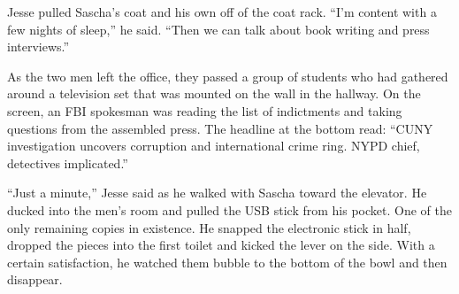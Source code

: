\documentclass[12pt]{book}
\begin{document}
Jesse pulled Sascha's coat and his own off of the coat rack.  ``I'm content with a few nights of sleep,'' he said.  ``Then we can talk about book writing and press interviews.''

As the two men left the office, they passed a group of students who had gathered around a television set that was mounted on the wall in the hallway.  On the screen, an FBI spokesman was reading the list of indictments and taking questions from the assembled press.  The headline at the bottom read: ``CUNY investigation uncovers corruption and international crime ring.  NYPD chief, detectives implicated.''

``Just a minute,'' Jesse said as he walked with Sascha toward the elevator.  He ducked into the men's room and pulled the USB stick from his pocket.  One of the only remaining copies in existence.  He snapped the electronic stick in half, dropped the pieces into the first toilet and kicked the lever on the side.  With a certain satisfaction, he watched them bubble to the bottom of the bowl and then disappear.
\end{document}
